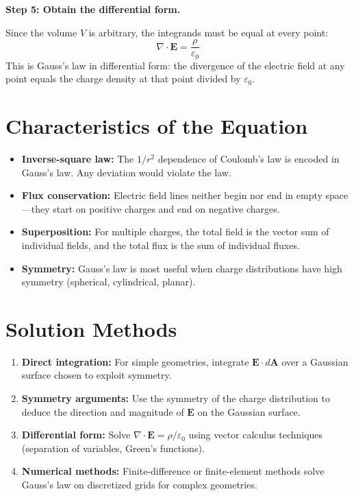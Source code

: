 \textbf{Step 5: Obtain the differential form.}

Since the volume $V$ is arbitrary, the integrands must be equal at every point:
\begin{equation}
\boxed{\nabla \cdot \mathbf{E} = \frac{\rho}{\varepsilon_0}}
\end{equation}
This is Gauss's law in differential form: the divergence of the electric field at any point equals the charge density at that point divided by $\varepsilon_0$.

\section*{Characteristics of the Equation}

\begin{itemize}
\item \textbf{Inverse-square law:} The $1/r^2$ dependence of Coulomb's law is encoded in Gauss's law. Any deviation would violate the law.
\item \textbf{Flux conservation:} Electric field lines neither begin nor end in empty space---they start on positive charges and end on negative charges.
\item \textbf{Superposition:} For multiple charges, the total field is the vector sum of individual fields, and the total flux is the sum of individual fluxes.
\item \textbf{Symmetry:} Gauss's law is most useful when charge distributions have high symmetry (spherical, cylindrical, planar).
\end{itemize}

\section*{Solution Methods}

\begin{enumerate}
\item \textbf{Direct integration:} For simple geometries, integrate $\mathbf{E} \cdot d\mathbf{A}$ over a Gaussian surface chosen to exploit symmetry.
\item \textbf{Symmetry arguments:} Use the symmetry of the charge distribution to deduce the direction and magnitude of $\mathbf{E}$ on the Gaussian surface.
\item \textbf{Differential form:} Solve $\nabla \cdot \mathbf{E} = \rho/\varepsilon_0$ using vector calculus techniques (separation of variables, Green's functions).
\item \textbf{Numerical methods:} Finite-difference or finite-element methods solve Gauss's law on discretized grids for complex geometries.
\end{enumerate}

